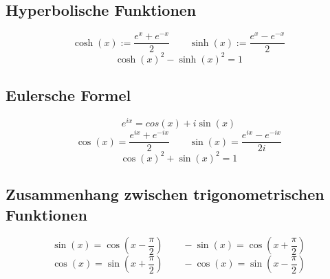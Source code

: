 \documentclass[10pt,a4paper]{article}
\begin{document}
\subsection*{Hyperbolische Funktionen}
\[\cosh(x) := \frac{e^x + e^{-x}}{2} \qquad \sinh(x) := \frac{e^x - e^{-x}}{2}\] 
\[\cosh(x)^2 - \sinh(x)^2 = 1\]

\subsection*{Eulersche Formel}
\[e^{ix}=cos(x)+i\sin(x)\]
\[\cos(x)=\frac{e^{ix}+e^{-ix}}{2}\qquad \sin(x)=\frac{e^{ix}-e^{-ix}}{2i}\]
\[\cos(x)^2 + \sin(x)^2 = 1\]

\subsection*{Zusammenhang zwischen trigonometrischen Funktionen}
\[\sin(x)=\cos\left(x-\frac{\pi}{2}\right) \qquad -\sin(x)=\cos\left(x+\frac{\pi}{2}\right)\]
\[\cos(x)=\sin\left(x+\frac{\pi}{2}\right) \qquad -\cos(x)=\sin\left(x-\frac{\pi}{2}\right)\]
\end{document}
